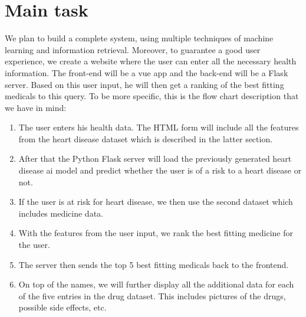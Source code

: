 \documentclass{article}
\begin{document}
\section{Main task}
We plan to build a complete system, using multiple techniques of machine learning and information retrieval. Moreover, to guarantee a good user experience, 
we create a website where the user can enter all the necessary health information. The front-end will be a vue app and the back-end will be a Flask server.
Based on this user input, he will then get a ranking of the best fitting medicals to this query.
To be more specific, this is the flow chart description that we have in mind:
\begin{enumerate}
    \item The user enters his health data. The HTML form will include all the features from the heart disease dataset which is described in the latter section.
    \item After that the Python Flask server will load the previously generated heart disease ai model and predict whether the user is of a risk to a heart disease or not.
    \item If the user is at risk for heart disease, we then use the second dataset which includes medicine data.
    \item With the features from the user input, we rank the best fitting medicine for the user.
    \item The server then sends the top 5 best fitting medicals back to the frontend.
    \item On top of the names, we will further display all the additional data for each of the five entries in the drug dataset. This includes pictures of the drugs, possible side effects, etc.
\end{enumerate} 

\end{document}
